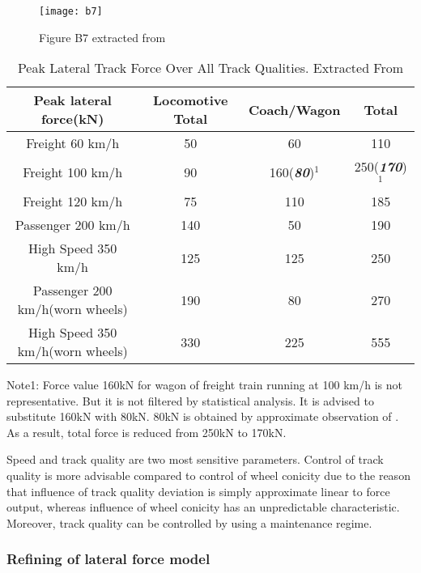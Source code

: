 \begin{figure}[h!]
    \centering
    \texttt{[image: b7]}
    \caption{Figure B7 extracted from \citet{d181dt329}}
    \label{fig:b7}
\end{figure}

\begin{table}[h!]
    \centering
    \caption{Peak Lateral Track Force Over All Track Qualities. Extracted From \citet[Tab. B1]{d181dt329}}
    \begin{tabular}{cccc}
        \hline
        Peak lateral force(kN) & Locomotive Total & Coach/Wagon & Total \\ 
        \hline
        Freight 60 km/h & 50 & 60 & 110\\
        Freight 100 km/h & 90 & 160(\textbf{\textit{80}})$^1$ & 250(\textbf{\textit{170}})$^1$\\
        Freight 120 km/h & 75 & 110 & 185 \\
        Passenger 200 km/h & 140 & 50 & 190 \\
        High Speed 350 km/h & 125 & 125 & 250 \\
        Passenger 200 km/h(worn wheels) & 190 & 80 & 270 \\
        High Speed 350 km/h(worn wheels) & 330 & 225 & 555 \\
        \hline
    \end{tabular}
    \begin{flushleft}
    Note1: Force value 160kN for wagon of freight train running at 100 km/h is not representative. But it is not filtered by statistical analysis. It is advised to substitute 160kN with 80kN. 80kN is obtained by approximate observation of \citet[Figure B7]{d181dt329}. As a result, total force is reduced from 250kN to 170kN.
    \end{flushleft}
    \label{tab:peaklateralforce}
\end{table}

Speed and track quality are two most sensitive parameters. Control of track quality is more advisable compared to control of wheel conicity due to the reason that influence of track quality deviation is simply approximate linear to force output, whereas influence of wheel conicity has an unpredictable characteristic. Moreover, track quality can be controlled by using a maintenance regime.

\subsubsection{Refining of lateral force model}

